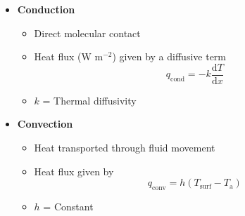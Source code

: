 \documentclass{beamer}
\begin{document}
\begin{frame}
\begin{columns}[t]
\begin{column}{0.5\paperwidth}
      \begin{itemize}
      \item \textbf{Conduction}
        \begin{itemize}
        \item Direct molecular contact \\
        \item Heat flux (W m$^{-2}$) given by a diffusive term
          $$ q_{\text{cond}} = -k \frac{\mathrm{d} T}{\mathrm{d} x}$$
        \item $k$ = Thermal diffusivity \\
        \end{itemize}
        \vspace{0.9cm}
      \item \textbf{Convection}
        \begin{itemize}
        \item Heat transported through fluid movement
        \item Heat flux given by
          $$ q_{\text{conv}} = h (T_{\text{surf}} - T_{\text{a}}) $$
        \item $h$ = Constant \\
        \end{itemize}
      \end{itemize}
    \end{column}

  \end{columns}
  
\end{frame}
\end{document}
